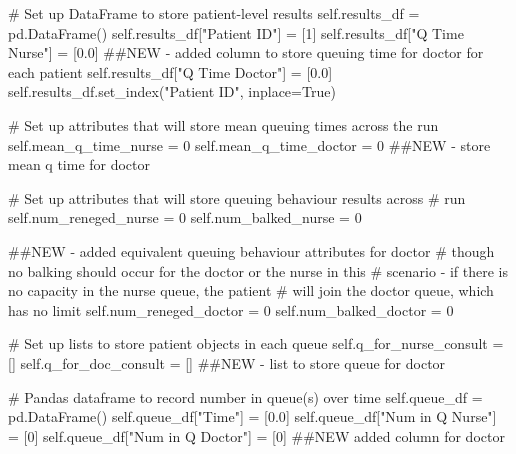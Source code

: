 \documentclass[
  letterpaper,
  DIV=11,
  numbers=noendperiod]{scrreprt}
\newenvironment{Shaded}{}{}
\newcommand{\CommentTok}[1]{\textcolor[rgb]{0.42,0.45,0.49}{#1}}
\newcommand{\DecValTok}[1]{\textcolor[rgb]{0.00,0.36,0.77}{#1}}
\newcommand{\FloatTok}[1]{\textcolor[rgb]{0.00,0.36,0.77}{#1}}
\newcommand{\NormalTok}[1]{\textcolor[rgb]{0.14,0.16,0.18}{#1}}
\newcommand{\OperatorTok}[1]{\textcolor[rgb]{0.14,0.16,0.18}{#1}}
\newcommand{\StringTok}[1]{\textcolor[rgb]{0.01,0.18,0.38}{#1}}
\newcommand{\VariableTok}[1]{\textcolor[rgb]{0.89,0.38,0.04}{#1}}
\begin{document}
\begin{tcolorbox}
\begin{Shaded}
\begin{Highlighting}[]
        \CommentTok{\# Set up DataFrame to store patient{-}level results}
        \VariableTok{self}\NormalTok{.results\_df }\OperatorTok{=}\NormalTok{ pd.DataFrame()}
        \VariableTok{self}\NormalTok{.results\_df[}\StringTok{"Patient ID"}\NormalTok{] }\OperatorTok{=}\NormalTok{ [}\DecValTok{1}\NormalTok{]}
        \VariableTok{self}\NormalTok{.results\_df[}\StringTok{"Q Time Nurse"}\NormalTok{] }\OperatorTok{=}\NormalTok{ [}\FloatTok{0.0}\NormalTok{]}
        \CommentTok{\#\#NEW {-} added column to store queuing time for doctor for each patient}
        \VariableTok{self}\NormalTok{.results\_df[}\StringTok{"Q Time Doctor"}\NormalTok{] }\OperatorTok{=}\NormalTok{ [}\FloatTok{0.0}\NormalTok{]}
        \VariableTok{self}\NormalTok{.results\_df.set\_index(}\StringTok{"Patient ID"}\NormalTok{, inplace}\OperatorTok{=}\VariableTok{True}\NormalTok{)}

        \CommentTok{\# Set up attributes that will store mean queuing times across the run}
        \VariableTok{self}\NormalTok{.mean\_q\_time\_nurse }\OperatorTok{=} \DecValTok{0}
        \VariableTok{self}\NormalTok{.mean\_q\_time\_doctor }\OperatorTok{=} \DecValTok{0} \CommentTok{\#\#NEW {-} store mean q time for doctor}

        \CommentTok{\# Set up attributes that will store queuing behaviour results across}
        \CommentTok{\# run}
        \VariableTok{self}\NormalTok{.num\_reneged\_nurse }\OperatorTok{=} \DecValTok{0}
        \VariableTok{self}\NormalTok{.num\_balked\_nurse }\OperatorTok{=} \DecValTok{0}

        \CommentTok{\#\#NEW {-} added equivalent queuing behaviour attributes for doctor}
        \CommentTok{\# though no balking should occur for the doctor or the nurse in this}
        \CommentTok{\# scenario {-} if there is no capacity in the nurse queue, the patient}
        \CommentTok{\# will join the doctor queue, which has no limit}
        \VariableTok{self}\NormalTok{.num\_reneged\_doctor }\OperatorTok{=} \DecValTok{0}
        \VariableTok{self}\NormalTok{.num\_balked\_doctor }\OperatorTok{=} \DecValTok{0}

        \CommentTok{\# Set up lists to store patient objects in each queue}
        \VariableTok{self}\NormalTok{.q\_for\_nurse\_consult }\OperatorTok{=}\NormalTok{ []}
        \VariableTok{self}\NormalTok{.q\_for\_doc\_consult }\OperatorTok{=}\NormalTok{ [] }\CommentTok{\#\#NEW {-} list to store queue for doctor}

        \CommentTok{\# Pandas dataframe to record number in queue(s) over time}
        \VariableTok{self}\NormalTok{.queue\_df }\OperatorTok{=}\NormalTok{ pd.DataFrame()}
        \VariableTok{self}\NormalTok{.queue\_df[}\StringTok{"Time"}\NormalTok{] }\OperatorTok{=}\NormalTok{ [}\FloatTok{0.0}\NormalTok{]}
        \VariableTok{self}\NormalTok{.queue\_df[}\StringTok{"Num in Q Nurse"}\NormalTok{] }\OperatorTok{=}\NormalTok{ [}\DecValTok{0}\NormalTok{]}
        \VariableTok{self}\NormalTok{.queue\_df[}\StringTok{"Num in Q Doctor"}\NormalTok{] }\OperatorTok{=}\NormalTok{ [}\DecValTok{0}\NormalTok{] }\CommentTok{\#\#NEW added column for doctor}


\end{Highlighting}
\end{Shaded}
\end{tcolorbox}
\end{document}
